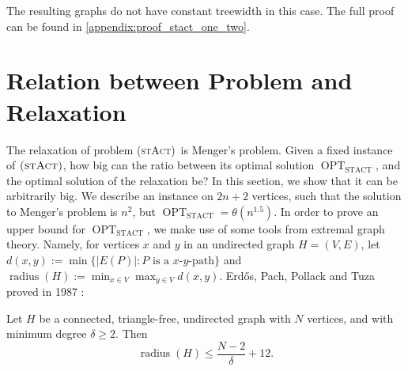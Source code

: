 \documentclass[runningheads]{llncs}
\numberwithin{equation}{section}
\newcommand{\set}[1]{\{ #1 \}}
\newcommand{\stact}{\textsc{(stAct)}}
\DeclareMathOperator{\radius}{\text{radius}}
\DeclareMathOperator{\opt}{OPT}
\newcommand{\optDirStAct}{\opt_\text{STACT}}
\begin{document}
The resulting graphs do not have constant treewidth in this case. The full proof can be found in \cref{appendix:proof_stact_one_two}. 

\section{Relation between Problem and Relaxation}
\label{sec:ratio_relaxation}
The relaxation of problem \stact\ is Menger's problem. Given a fixed instance of $\stact$, how big can the ratio between its optimal solution $\optDirStAct$, and the optimal solution of the relaxation be? In this section, we show that it can be arbitrarily big. We describe an instance on $2n+2$ vertices, such that the solution to Menger's problem is $n^2$, but  $\optDirStAct = \theta(n^{1.5})$. In order to prove an upper bound for $\optDirStAct$, we make use of some tools from extremal graph theory. Namely, for vertices $x$ and $y$ in an undirected graph $H = (V, E)$, let $d(x, y) := \min\set{ |E(P)| : P \text{ is a $x$-$y$-path}}$ and $\radius(H) := \min_{x \in V} \max_{y \in V} d(x, y)$. Erd\H{o}s, Pach, Pollack and Tuza proved in 1987 \cite{erdHos1989radius}:
\begin{theorem}
\label{thm_mindegree_diameter_erdos}
Let $H$ be a connected, triangle-free, undirected graph with $N$ vertices, and with minimum degree $\delta \geq 2$. Then
\[\radius(H) \leq \frac{N-2}{\delta} + 12.\] 
\end{theorem}
\end{document}
